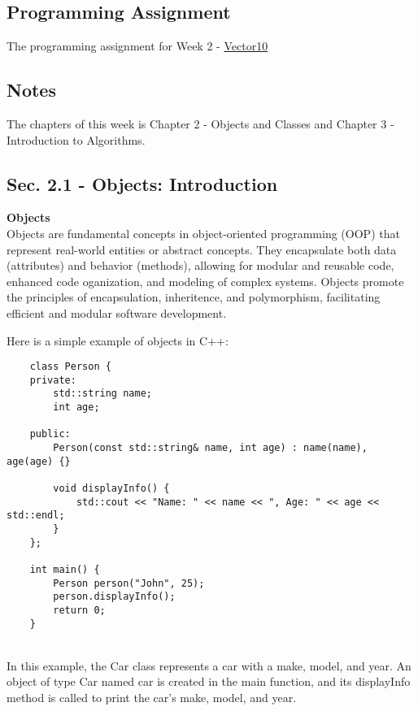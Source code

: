 \subsection{Programming Assignment}
The programming assignment for Week 2 - \href{https://github.com/cu-cspb-2270-Summer-2023/pa1-RelativiBit}{Vector10}

\subsection{Notes}
The chapters of this week is Chapter 2 - Objects and Classes and Chapter 3 - Introduction to Algorithms. \\

\subsection{Sec. 2.1 - Objects: Introduction}
\noindent \textbf{Objects} \\

Objects are fundamental concepts in object-oriented programming (OOP) that represent real-world entities or abstract concepts. They encapsulate both data (attributes) and behavior (methods), allowing for modular and reusable
code, enhanced code oganization, and modeling of complex systems. Objects promote the principles of encapsulation, inheritence, and polymorphism, facilitating efficient and modular software development.

\begin{solution}
    Here is a simple example of objects in C++: \\
    \horizontalline
    \begin{verbatim}
    class Person {
    private:
        std::string name;
        int age;
    
    public:
        Person(const std::string& name, int age) : name(name), age(age) {}

        void displayInfo() {
            std::cout << "Name: " << name << ", Age: " << age << std::endl;
        }
    };

    int main() {
        Person person("John", 25);
        person.displayInfo();
        return 0;
    }
    \end{verbatim} \\
    \horizontalline
    In this example, the Car class represents a car with a make, model, and year. An object of type Car named car is created in the main function, and its displayInfo method is called to print the car's make, model, and year.
\end{solution}

